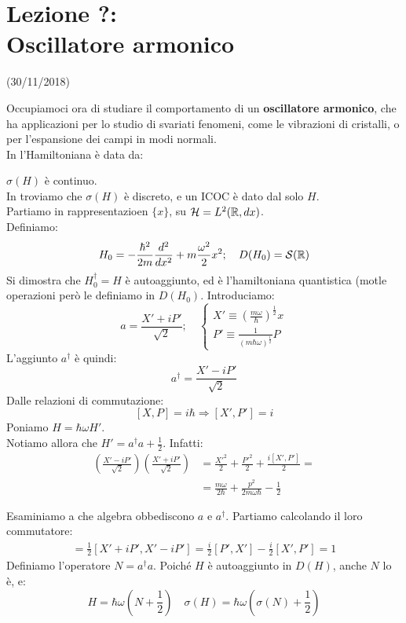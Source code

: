 \documentclass[../../FisicaTeorica.tex]{subfiles}
\begin{document}
\section{Lezione ?:\\ \large{Oscillatore armonico}}
\vspace{-1em}
\begin{center}
    \small{(30/11/2018)}
\end{center}
Occupiamoci ora di studiare il comportamento di un \textbf{oscillatore armonico}, che ha applicazioni per lo studio di svariati fenomeni, come le vibrazioni di cristalli, o per l'espansione dei campi in modi normali.\\
In \MC l'Hamiltoniana è data da:

$\sigma(H)$ è continuo.\\

In \MQ troviamo che $\sigma(H)$ è discreto, e un ICOC è dato dal solo $H$.\\
Partiamo in rappresentazioen $\{x\}$, su $\mathcal{H}=L^2(\mathbb{R},dx)$.\\
Definiamo:
\[
H_0 = -\frac{\hbar^2}{2m}\frac{d^2}{dx^2}+m\frac{\omega^2}{2}x^2; \quad D(H_0)=\mathcal{S}(\mathbb{R})
\]
Si dimostra che $H_0^\dag = H$ è autoaggiunto, ed è l'hamiltoniana quantistica (motle operazioni però le definiamo in $D(H_0)$.
Introduciamo:
\[
a=\frac{X'+iP'}{\sqrt{2}}; \quad \begin{cases}
X' \equiv \left ( \frac{m\omega}{\hbar}\right)^{\frac{1}{2}} x\\
P' \equiv \frac{1}{(m\hbar \omega)^{\frac{1}{2}}} P
\end{cases}
\]
L'aggiunto $a^\dag$ è quindi:
\[
a^\dag = \frac{X' - iP'}{\sqrt{2}}
\]
Dalle relazioni di commutazione:
\[
[X,P]=i\hbar \Rightarrow  [X',P']=i
\]
Poniamo $H=\hbar \omega  H'$.\\
Notiamo allora che $H' = a^\dag a +\frac{1}{2}$. Infatti:
\begin{align*}
\left(\frac{X'-iP'}{\sqrt{2}}\right)\left(\frac{X'+iP'}{\sqrt{2}}\right) &= \frac{X'^2}{2}+\frac{P'^2}{2}+\frac{i[X',P']}{2}=\\
&=\frac{m\omega}{2\hbar} + \frac{p^2}{2m\omega\hbar}-\frac{1}{2}
\end{align*}

Esaminiamo a che algebra obbediscono $a$ e $a^\dag$. Partiamo calcolando il loro commutatore:
\begin{align*}
[a,a^\dag]=\frac{1}{2}[X'+iP', X'-iP'] = \frac{i}{2}[P',X']-\frac{i}{2}[X',P']=1
\end{align*}
Definiamo l'operatore $N = a^\dag a$. Poiché $H$ è autoaggiunto in $D(H)$, anche $N$ lo è, e:
\[
H=\hbar \omega \left(N+\frac{1}{2}\right) \quad \sigma(H) = \hbar \omega\left(\sigma(N)+\frac{1}{2}\right)
\]
\end{document}
